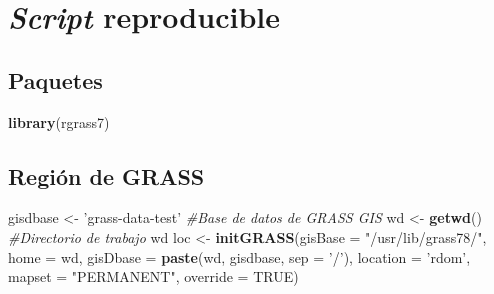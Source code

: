 \documentclass[11pt,]{article}
\newenvironment{Shaded}{\begin{snugshade}}{\end{snugshade}}
\newcommand{\KeywordTok}[1]{\textcolor[rgb]{0.13,0.29,0.53}{\textbf{#1}}}
\newcommand{\DataTypeTok}[1]{\textcolor[rgb]{0.13,0.29,0.53}{#1}}
\newcommand{\StringTok}[1]{\textcolor[rgb]{0.31,0.60,0.02}{#1}}
\newcommand{\CommentTok}[1]{\textcolor[rgb]{0.56,0.35,0.01}{\textit{#1}}}
\newcommand{\OtherTok}[1]{\textcolor[rgb]{0.56,0.35,0.01}{#1}}
\newcommand{\OperatorTok}[1]{\textcolor[rgb]{0.81,0.36,0.00}{\textbf{#1}}}
\newcommand{\NormalTok}[1]{#1}
\begin{document}
\section{\texorpdfstring{\emph{Script}
reproducible}{Script reproducible}}\label{script-reproducible}

\subsection{Paquetes}\label{paquetes}

\begin{Shaded}
\begin{Highlighting}[]
\KeywordTok{library}\NormalTok{(rgrass7)}
\end{Highlighting}
\end{Shaded}

\subsection{Región de GRASS}\label{regiuxf3n-de-grass}

\begin{Shaded}
\begin{Highlighting}[]
\NormalTok{gisdbase <-}\StringTok{ 'grass-data-test'} \CommentTok{#Base de datos de GRASS GIS}
\NormalTok{wd <-}\StringTok{ }\KeywordTok{getwd}\NormalTok{() }\CommentTok{#Directorio de trabajo}
\NormalTok{wd}
\NormalTok{loc <-}\StringTok{ }\KeywordTok{initGRASS}\NormalTok{(}\DataTypeTok{gisBase =} \StringTok{"/usr/lib/grass78/"}\NormalTok{,}
                 \DataTypeTok{home =}\NormalTok{ wd,}
                 \DataTypeTok{gisDbase =} \KeywordTok{paste}\NormalTok{(wd, gisdbase, }\DataTypeTok{sep =} \StringTok{'/'}\NormalTok{),}
                 \DataTypeTok{location =} \StringTok{'rdom'}\NormalTok{,}
                 \DataTypeTok{mapset =} \StringTok{"PERMANENT"}\NormalTok{,}
                 \DataTypeTok{override =} \OtherTok{TRUE}\NormalTok{)}
\end{Highlighting}
\end{Shaded}

\begin{Shaded}
\end{Shaded}
\end{document}
